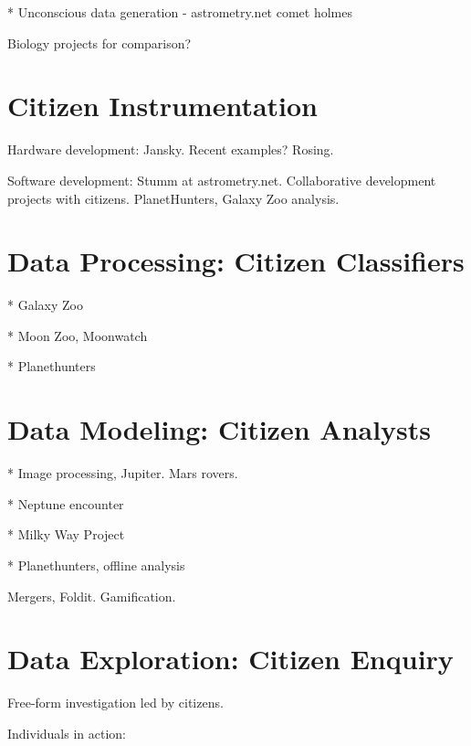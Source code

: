\documentclass{ar2e}
\begin{document}
* Unconscious data generation - astrometry.net comet holmes

Biology projects for comparison?



\section{Citizen Instrumentation}
\label{sec:builders}

Hardware development: Jansky. Recent examples? Rosing.

Software development: Stumm at astrometry.net.  Collaborative development
projects with citizens. PlanetHunters, Galaxy Zoo analysis.



\section{Data Processing: Citizen Classifiers}
\label{sec:classifiers}

* Galaxy Zoo

* Moon Zoo, Moonwatch

* Planethunters



\section{Data Modeling: Citizen Analysts}
\label{sec:modelers}

* Image processing, Jupiter. Mars rovers.

* Neptune encounter

* Milky Way Project

* Planethunters, offline analysis

Mergers, Foldit. Gamification. 


\section{Data Exploration: Citizen Enquiry}
\label{sec:inquirers}

Free-form investigation led by citizens.

Individuals in action:
\end{document}
